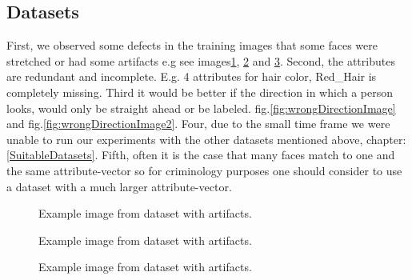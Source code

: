 \documentclass[12pt, a4paper]{article}
\begin{document}
\subsection{Datasets}
First, we observed some defects in the training images that some faces were stretched or had some artifacts e.g see images\ref{fig:badDatasetImage}, \ref{fig:badDatasetImage2} and \ref{fig:badDatasetImage3}.
Second, the attributes are redundant and incomplete. E.g. 4 attributes for hair color, Red\_Hair is completely missing. 
Third it would be better if the direction in which a person looks, would only be straight ahead or be labeled. fig.\ref{fig:wrongDirectionImage} and fig.\ref{fig:wrongDirectionImage2}.
Four, due to the small time frame we were unable to run our experiments with the other datasets mentioned above, chapter: \ref{SuitableDatasets}.
Fifth, often it is the case that many faces match to one and the same attribute-vector so for criminology purposes one should consider to use a dataset with a much larger attribute-vector.
\begin{figure}
    \caption{Example image from dataset with artifacts.}
    \label{fig:badDatasetImage}
\end{figure}
\begin{figure}
    \caption{Example image from dataset with artifacts.}
    \label{fig:badDatasetImage2}
\end{figure}
\begin{figure}
    \caption{Example image from dataset with artifacts.}
    \label{fig:badDatasetImage3}
\end{figure}
\end{document}
